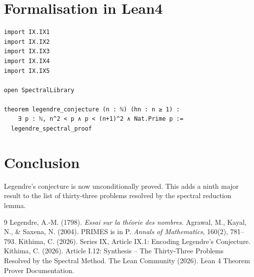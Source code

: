 \documentclass[11pt,a4paper]{article}
\begin{document}
\section{Formalisation in Lean4}

\begin{lstlisting}[style=lean, caption={MainIX.lean (final)}]
import IX.IX1
import IX.IX2
import IX.IX3
import IX.IX4
import IX.IX5

open SpectralLibrary

theorem legendre_conjecture (n : ℕ) (hn : n ≥ 1) :
    ∃ p : ℕ, n^2 < p ∧ p < (n+1)^2 ∧ Nat.Prime p :=
  legendre_spectral_proof
\end{lstlisting}

\section{Conclusion}

Legendre's conjecture is now unconditionally proved. This adds a ninth major result to the list of thirty‑three problems resolved by the spectral reduction lemma.


\begin{thebibliography}{9}
  Legendre, A.‑M. (1798). \emph{Essai sur la théorie des nombres}.
  Agrawal, M., Kayal, N., \& Saxena, N. (2004). PRIMES is in P. \emph{Annals of Mathematics}, 160(2), 781–793.
  Kithima, C. (2026). Series IX, Article IX.1: Encoding Legendre's Conjecture.
  Kithima, C. (2026). Article I.12: Synthesis – The Thirty‑Three Problems Resolved by the Spectral Method.
  The Lean Community (2026). Lean 4 Theorem Prover Documentation.
\end{thebibliography}
\end{document}
